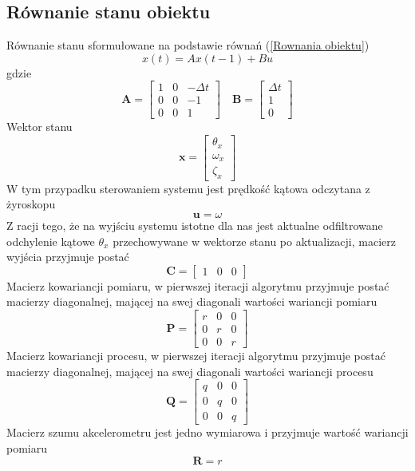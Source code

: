 \subsection{Równanie stanu obiektu}
Równanie stanu sformułowane na podstawie równań (\ref{Rownania obiektu})
$$
    x(t) = Ax(t-1) + Bu
$$
gdzie
$$
    \mathbf{A} =
    \left[
    \begin{array}{ccc}
        1 & 0 & -\Delta t \\
        0 & 0 & -1 \\
        0 & 0 & 1
    \end{array}
    \right]
    \quad
    \mathbf{B} = 
    \left[
    \begin{array}{c}
        \Delta t \\
        1 \\
        0
    \end{array}
    \right]
$$
%
Wektor stanu
$$
    \mathbf{x} = 
    \left[
    \begin{array}{c}
        \theta_x \\
        \omega_x \\
        \zeta_x
    \end{array}
    \right]
$$
%
W tym przypadku sterowaniem systemu jest prędkość kątowa odczytana z żyroskopu
$$
    \mathbf{u} = \omega
$$
%
Z racji tego, że na wyjściu systemu istotne dla nas jest aktualne odfiltrowane odchylenie kątowe $\theta_x$ przechowywane w wektorze stanu po aktualizacji, macierz wyjścia przyjmuje postać
$$
    \mathbf{C} = 
    \left[
    \begin{array}{ccc}
        1 & 0 & 0
    \end{array}
    \right]
$$
%
Macierz kowariancji pomiaru, w pierwszej iteracji algorytmu przyjmuje postać macierzy diagonalnej, mającej na swej diagonali wartości wariancji pomiaru
$$
    \mathbf{P} = 
    \left[
    \begin{array}{ccc}
        r & 0 & 0 \\
        0 & r & 0 \\
        0 & 0 & r
    \end{array}
    \right]
$$
%
Macierz kowariancji procesu, w pierwszej iteracji algorytmu przyjmuje postać macierzy diagonalnej, mającej na swej diagonali wartości wariancji procesu
$$
    \mathbf{Q} = 
    \left[
    \begin{array}{ccc}
        q & 0 & 0 \\
        0 & q & 0 \\
        0 & 0 & q
    \end{array}
    \right]
$$
%
Macierz szumu akcelerometru jest jedno wymiarowa i przyjmuje wartość wariancji pomiaru
$$
    \mathbf{R} = r
$$


